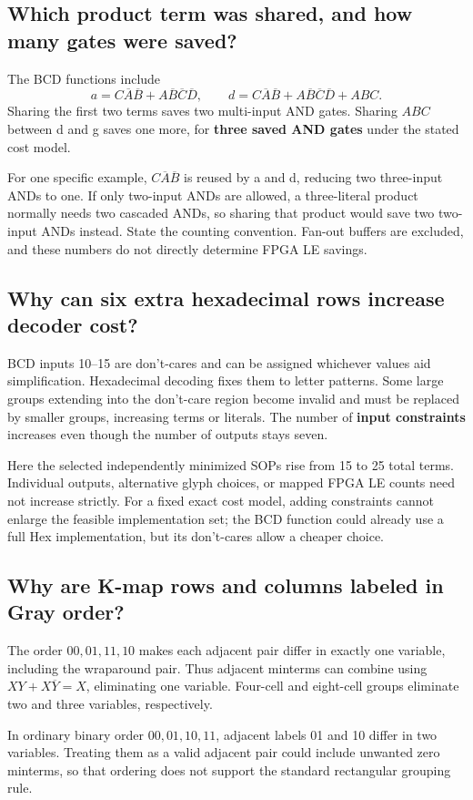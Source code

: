 \documentclass[a4paper,11pt]{article}
\begin{document}
\subsection{Which product term was shared, and how many gates were saved?}
The BCD functions include
\[
a=C\overline A\overline B+A\overline B\overline C\overline D,\qquad
d=C\overline A\overline B+A\overline B\overline C\overline D+ABC.
\]
Sharing the first two terms saves two multi-input AND gates. Sharing $ABC$ between d
and g saves one more, for \textbf{three saved AND gates} under the stated cost model.

For one specific example, $C\overline A\overline B$ is reused by a and d, reducing two
three-input ANDs to one. If only two-input ANDs are allowed, a three-literal product
normally needs two cascaded ANDs, so sharing that product would save two two-input
ANDs instead. State the counting convention. Fan-out buffers are excluded, and these
numbers do not directly determine FPGA LE savings.
\subsection{Why can six extra hexadecimal rows increase decoder cost?}
BCD inputs 10--15 are don't-cares and can be assigned whichever values aid simplification.
Hexadecimal decoding fixes them to letter patterns. Some large groups extending into
the don't-care region become invalid and must be replaced by smaller groups, increasing
terms or literals. The number of \textbf{input constraints} increases even though the
number of outputs stays seven.

Here the selected independently minimized SOPs rise from 15 to 25 total terms. Individual
outputs, alternative glyph choices, or mapped FPGA LE counts need not increase strictly.
For a fixed exact cost model, adding constraints cannot enlarge the feasible implementation
set; the BCD function could already use a full Hex implementation, but its don't-cares
allow a cheaper choice.
\subsection{Why are K-map rows and columns labeled in Gray order?}
The order $00,01,11,10$ makes each adjacent pair differ in exactly one variable, including
the wraparound pair. Thus adjacent minterms can combine using
$XY+X\overline Y=X$, eliminating one variable. Four-cell and eight-cell groups eliminate
two and three variables, respectively.

In ordinary binary order $00,01,10,11$, adjacent labels 01 and 10 differ in two variables.
Treating them as a valid adjacent pair could include unwanted zero minterms, so that
ordering does not support the standard rectangular grouping rule.
\end{document}
